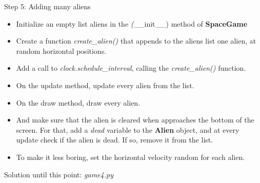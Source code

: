 \documentclass[10pt]{beamer}
\begin{document}
\begin{frame}{Step 5: Adding many aliens}

\begin{itemize}
\item Initialize an empty list aliens in the \textit(\_\_init\_\_) method of \textbf{SpaceGame}

\item Create a function \textit{create\_alien()} that appends to the aliens list one alien, at random horizontal positions.

\item Add a call to \textit{clock.schedule\_interval}, calling the \textit{create\_alien()} function. 

\item On the update method, update every alien from the list.

\item On the draw method, draw every alien.

\item And make sure that the alien is cleared when approaches the bottom of the screen. For that, add a \textit{dead} variable to the \textbf{Alien} object, and at every update check if the alien is dead.
If so, remove it from the list.

\item To make it less boring, set the horizontal velocity random for each alien.
\end{itemize}

\vfill
\small{
Solution until this point: \textit{game4.py} }

\end{frame}
\end{document}
